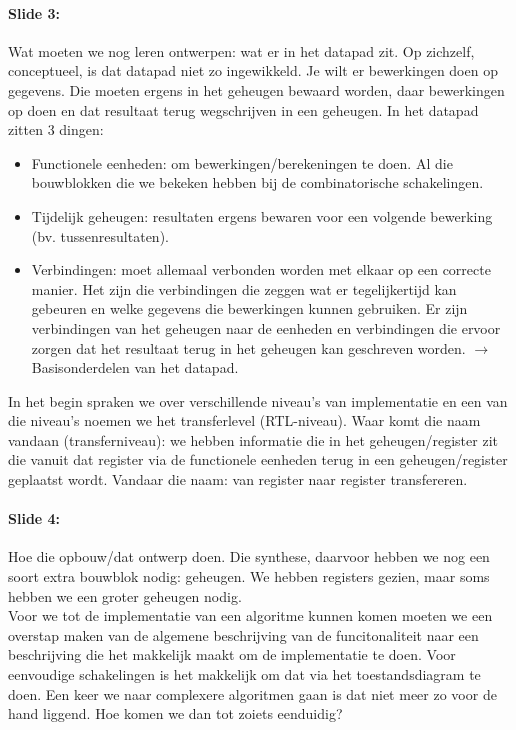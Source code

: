 \documentclass[10pt,a4paper]{book}
\begin{document}
\paragraph{Slide 3:} Wat moeten we nog leren ontwerpen: wat er in het datapad zit. Op zichzelf, conceptueel, is dat datapad niet zo ingewikkeld. Je wilt er bewerkingen doen op gegevens. Die moeten ergens in het geheugen bewaard worden, daar bewerkingen op doen en dat resultaat terug wegschrijven in een geheugen. In het datapad zitten 3 dingen:
\begin{itemize}
\item Functionele eenheden: om bewerkingen/berekeningen te doen. Al die bouwblokken die we bekeken hebben bij de combinatorische schakelingen.	
\item Tijdelijk geheugen: resultaten ergens bewaren voor een volgende bewerking (bv. tussenresultaten).	
\item Verbindingen: moet allemaal verbonden worden met elkaar op een correcte manier. Het zijn die verbindingen die zeggen wat er tegelijkertijd kan gebeuren en welke gegevens die bewerkingen kunnen gebruiken. Er zijn verbindingen van het geheugen naar de eenheden en verbindingen die ervoor zorgen dat het resultaat terug in het geheugen kan geschreven worden. $\rightarrow$ Basisonderdelen van het datapad.
\end{itemize}	
In het begin spraken we over verschillende niveau's van implementatie en een van die niveau's noemen we het transferlevel (RTL-niveau). Waar komt die naam vandaan (transferniveau): we hebben informatie die in het geheugen/register zit die vanuit dat register via de functionele eenheden terug in een geheugen/register geplaatst wordt. Vandaar die naam: van register naar register transfereren.

\paragraph{Slide 4:} Hoe die opbouw/dat ontwerp doen. Die synthese, daarvoor hebben we nog een soort extra bouwblok nodig: geheugen. We hebben registers gezien, maar soms hebben we een groter geheugen nodig.\\
Voor we tot de implementatie van een algoritme kunnen komen moeten we een overstap maken van de algemene beschrijving van de funcitonaliteit naar een beschrijving die het makkelijk maakt om de implementatie te doen. Voor eenvoudige schakelingen is het makkelijk om dat via het toestandsdiagram te doen. Een keer we naar complexere algoritmen gaan is dat niet meer zo voor de hand liggend. Hoe komen we dan tot zoiets eenduidig?
\end{document}
